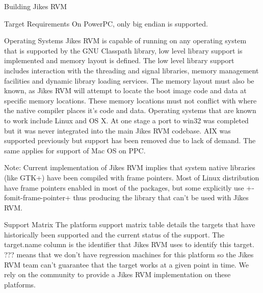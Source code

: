 \begin{section}{Building Jikes RVM}
\begin{subsection}{Target Requirements}
On PowerPC, only big endian is supported.

\begin{subsubsection}{Operating Systems}
Jikes RVM is capable of running on any operating system that is supported by the GNU Classpath library, low level library support is implemented and memory layout is defined. The low level library support includes interaction with the threading and signal libraries, memory management facilities and dynamic library loading services. The memory layout must also be known, as Jikes RVM will attempt to locate the boot image code and data at specific memory locations. These memory locations must not conflict with where the native compiler places it's code and data. Operating systems that are known to work include Linux and OS X. At one stage a port to win32 was completed but it was never integrated into the main Jikes RVM codebase. AIX was supported previously but support has been removed due to lack of demand. The same applies for support of Mac OS on PPC.

Note: Current implementation of Jikes RVM implies that system native libraries (like GTK+) have been compiled with frame pointers. Most of Linux distribution have frame pointers enabled in most of the packages, but some explicitly use \spverb+-fomit-frame-pointer+ thus producing the library that can't be used with Jikes RVM.
\end{subsubsection}

\begin{subsubsection}{Support Matrix}
The platform support matrix table details the targets that have historically been supported and the current status of the support. The target.name column is the identifier that Jikes RVM uses to identify this 
target. ??? means that we don't have regression machines for this platform so the Jikes RVM team can't guarantee that the target works at a given point in time. We rely on the community to provide a Jikes RVM implementation on these platforms.


\end{subsubsection}
\end{subsection}
\end{section}

